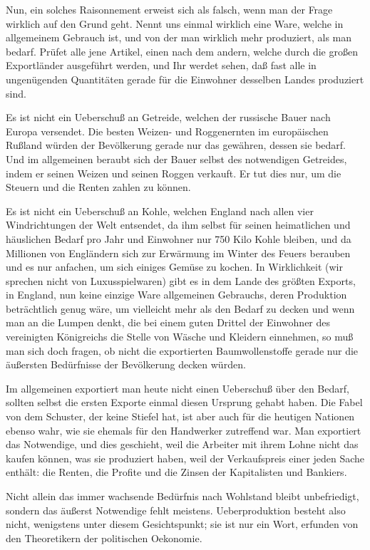 \documentclass{scrbook}
\begin{document}
Nun, ein solches Raisonnement erweist sich als falsch, wenn man der Frage wirklich auf den Grund geht. Nennt uns einmal wirklich eine Ware, welche in allgemeinem Gebrauch ist, und von der man wirklich mehr produziert, als man bedarf. Prüfet alle jene Artikel, einen nach dem andern, welche durch die großen Exportländer ausgeführt werden, und Ihr werdet sehen, daß fast alle in ungenügenden Quantitäten gerade für die Einwohner desselben Landes produziert sind.

Es ist nicht ein Ueberschuß an Getreide, welchen der russische Bauer nach Europa versendet. Die besten Weizen- und Roggenernten im europäischen Rußland würden der Bevölkerung gerade nur das gewähren, dessen sie bedarf. Und im allgemeinen beraubt sich der Bauer selbst des notwendigen Getreides, indem er seinen Weizen und seinen Roggen verkauft. Er tut dies nur, um die Steuern und die Renten zahlen zu können.

Es ist nicht ein Ueberschuß an Kohle, welchen England nach allen vier Windrichtungen der Welt entsendet, da ihm selbst für seinen heimatlichen und häuslichen Bedarf pro Jahr und Einwohner nur 750 Kilo Kohle bleiben, und da Millionen von Engländern sich zur Erwärmung im Winter des Feuers berauben und es nur anfachen, um sich einiges Gemüse zu kochen. In Wirklichkeit (wir sprechen nicht von Luxusspielwaren) gibt es in dem Lande des größten Exports, in England, nun keine einzige Ware allgemeinen Gebrauchs, deren Produktion beträchtlich genug wäre, um vielleicht mehr als den Bedarf zu decken und wenn man an die Lumpen denkt, die bei einem guten Drittel der Einwohner des vereinigten Königreichs die Stelle von Wäsche und Kleidern einnehmen, so muß man sich doch fragen, ob nicht die exportierten Baumwollenstoffe gerade nur die äußersten Bedürfnisse der Bevölkerung decken würden.

Im allgemeinen exportiert man heute nicht einen Ueberschuß über den Bedarf, sollten selbst die ersten Exporte einmal diesen Ursprung gehabt haben. Die Fabel von dem Schuster, der keine Stiefel hat, ist aber auch für die heutigen Nationen ebenso wahr, wie sie ehemals für den Handwerker zutreffend war. Man exportiert das Notwendige, und dies geschieht, weil die Arbeiter mit ihrem Lohne nicht das kaufen können, was sie produziert haben, weil der Verkaufspreis einer jeden Sache enthält: die Renten, die Profite und die Zinsen der Kapitalisten und Bankiers.

Nicht allein das immer wachsende Bedürfnis nach Wohlstand bleibt unbefriedigt, sondern das äußerst Notwendige fehlt meistens. Ueberproduktion besteht also nicht, wenigstens unter diesem Gesichtspunkt; sie ist nur ein Wort, erfunden von den Theoretikern der politischen Oekonomie.
\end{document}
